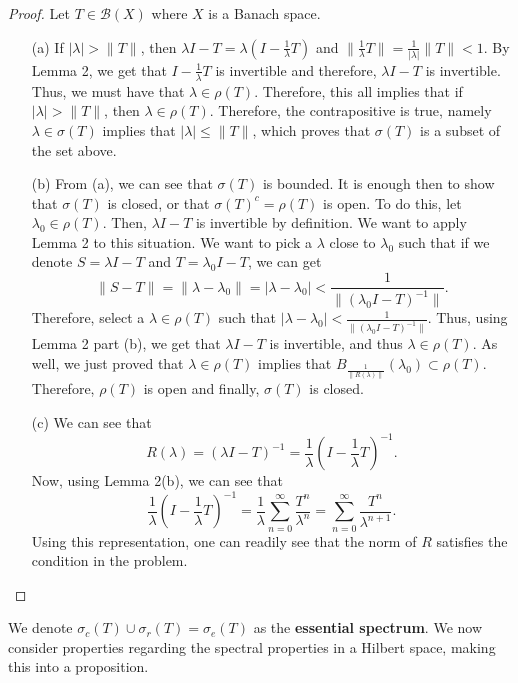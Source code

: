 \documentclass[12pt]{article}
\newcommand{\B}{\mathscr{B}}
\newcommand{\sumo}{\sum\limits_{n = 0}^{\infty}}
\newcommand{\sbs}{\subset}
\begin{document}
\begin{proof}
Let $T \in \B(X)$ where $X$ is a Banach space.
\begin{enumerate}[topsep=-15pt]
\item[(a)] If $|\lambda | > \| T \|$, then $\lambda I - T = \lambda (I - \frac{1}{\lambda} T)$ and $\| \frac{1}{\lambda} T \| = \frac{1}{|\lambda |} \| T \| < 1$. By Lemma 2, we get that $I - \frac{1}{\lambda} T$ is invertible and therefore, $\lambda I - T$ is invertible. Thus, we must have that $\lambda \in \rho(T)$. Therefore, this all implies that if $|\lambda | > \| T \|$, then $\lambda \in \rho(T)$. Therefore, the contrapositive is true, namely $\lambda \in \sigma(T)$ implies that $|\lambda | \leq \| T \|$, which proves that $\sigma(T)$ is a subset of the set above. 
\item[(b)] From (a), we can see that $\sigma(T)$ is bounded. It is enough then to show that $\sigma(T)$ is closed, or that $\sigma(T)^c = \rho(T)$ is open. To do this, let $\lambda_0 \in \rho(T)$. Then, $\lambda I - T$ is invertible by definition. We want to apply Lemma 2 to this situation. We want to pick a $\lambda$ close to $\lambda_0$ such that if we denote $S = \lambda I - T$ and $T = \lambda_0 I - T$, we can get 
\[ \| S - T \| = \| \lambda - \lambda_0 \| = |\lambda - \lambda_0| < \frac{1}{\| (\lambda_0 I - T)^{-1} \|}.\]
Therefore, select a $\lambda \in \rho(T)$ such that $ |\lambda - \lambda_0| < \frac{1}{\| (\lambda_0 I - T)^{-1} \|}$. Thus, using Lemma 2 part (b), we get that $\lambda I - T$ is invertible, and thus $\lambda \in \rho(T)$. As well, we just proved that $\lambda \in \rho(T)$ implies that $B_{\frac{1}{\| R(\lambda) \|}}(\lambda_0) \sbs \rho(T)$. Therefore, $\rho(T)$ is open and finally, $\sigma(T)$ is closed. 
\item[(c)] We can see that 
\[ R(\lambda) = (\lambda I - T)^{-1} = \frac{1}{\lambda} \left(I - \frac{1}{\lambda}T\right)^{-1}. \]
Now, using Lemma 2(b), we can see that 
\[ \frac{1}{\lambda} \left(I - \frac{1}{\lambda}T\right)^{-1} =  \frac{1}{\lambda} \sumo \frac{T^n}{\lambda^n} = \sumo \frac{T^n}{\lambda^{n+1}}.\]
Using this representation, one can readily see that the norm of $R$ satisfies the condition in the problem. 
\end{enumerate}
\end{proof}
\vspace{-25pt}
We denote $\sigma_c(T) \cup \sigma_r(T) = \sigma_e(T)$ as the \textbf{essential spectrum}. We now consider properties regarding the spectral properties in a Hilbert space, making this into a proposition.
\end{document}
